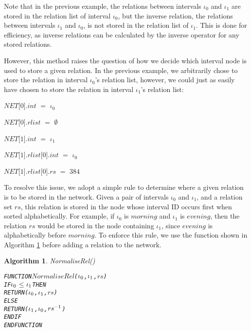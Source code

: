 \documentclass[11pt]{report}
\newenvironment{vverbatim}
{
  \begin{alltt}
}
{
    \vspace{-\baselineskip}
  \end{alltt}
}
\newtheorem{vvalgorithm}{Algorithm}[chapter]
\newenvironment{valgorithm}[2]
{
  \begin{vvalgorithm}{#1}
    \label{#2}
    \small
    \begin{vverbatim}
}
{
    \end{vverbatim}
  \end{vvalgorithm}
}
\newenvironment{vquote}
{
  \begin{list}{}{\leftmargin 1em}\item[]
}
{
  \end{list}
}
\begin{document}
          Note that in the previous example, the relations between intervals
          $\iota_0$ and $\iota_1$ are stored in the relation list of interval
          $\iota_0$, but the inverse relation, the relations between intervals
          $\iota_1$ and $\iota_0$, is not stored in the relation list of
          $\iota_1$. This is done for efficiency, as inverse relations can be
          calculated by the inverse operator for any stored relations.

          However, this method raises the question of how we decide which
          interval node is used to store a given relation. In the previous
          example, we arbitrarily chose to store the relation in interval
          $\iota_0$'s relation list, however, we could just as easily have
          chosen to store the relation in interval $\iota_1$'s relation list:

          \begin{vquote}
            $NET$[$0$].$int$ $=$ $\iota_0$

            $NET$[$0$].$rlist$ $=$ $\emptyset$

            $NET$[$1$].$int$ $=$ $\iota_1$

            $NET$[$1$].$rlist$[$0$].$int$ $=$ $\iota_0$

            $NET$[$1$].$rlist$[$0$].$rs$ $=$ $384$
          \end{vquote}

          To resolve this issue, we adopt a simple rule to determine where a
          given relation is to be stored in the network. Given a pair of
          intervals $\iota_0$ and $\iota_1$, and a relation set $rs$, this
          relation is stored in the node whose interval ID occurs first when
          sorted alphabetically. For example, if $\iota_0$ is $morning$ and
          $\iota_1$ is $evening$, then the relation $rs$ would be stored
          in the node containing $\iota_1$, since $evening$ is alphabetically
          before $morning$. To enforce this rule, we use the function shown
          in Algorithm \ref{algo-impln-norml} before adding a relation to the
          network.

          \begin{valgorithm}{NormaliseRel()}{algo-impln-norml}
FUNCTION \(NormaliseRel\)(\(\iota\sb{0}\), \(\iota\sb{1}\), \(rs\))
  IF \(\iota\sb{0}\) \(\leq\) \(\iota\sb{1}\) THEN
    RETURN (\(\iota\sb{0}\), \(\iota\sb{1}\), \(rs\))
  ELSE
    RETURN (\(\iota\sb{1}\), \(\iota\sb{0}\), \(rs\sp{-1}\))
  ENDIF
ENDFUNCTION
          \end{valgorithm}
\end{document}
